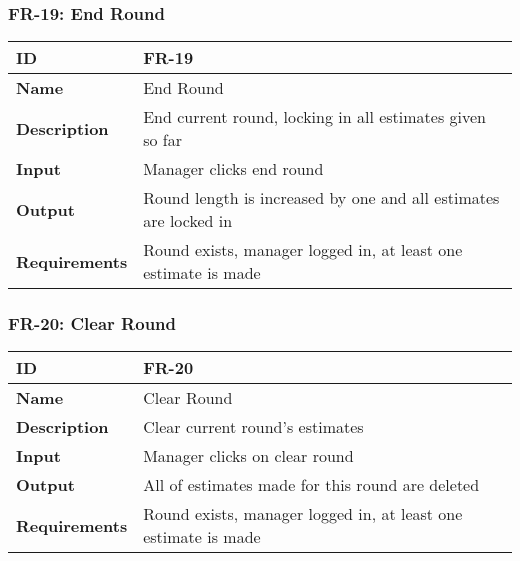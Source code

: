     

    \subsubsection{FR-19: End Round}
    \begin{center}
        \begin{tabularx}{\textwidth}{|l|X|}
            \hline
            \textbf{ID} & FR-19 \\
            \hline
            \textbf{Name} & End Round \\
            \hline
            \textbf{Description} & End current round, locking in all estimates given so far \\
            \hline
            \textbf{Input} & Manager clicks end round \\
            \hline
            \textbf{Output} & Round length is increased by one and all estimates are locked in \\
            \hline
            \textbf{Requirements} & Round exists, manager logged in, at least one estimate is made \\
            \hline
        \end{tabularx}
    \end{center}
    
    

    \subsubsection{FR-20: Clear Round}
    \begin{center}
        \begin{tabularx}{\textwidth}{|l|X|}
            \hline
            \textbf{ID} & FR-20 \\
            \hline
            \textbf{Name} & Clear Round \\
            \hline
            \textbf{Description} & Clear current round's estimates \\
            \hline
            \textbf{Input} & Manager clicks on clear round \\
            \hline
            \textbf{Output} & All of estimates made for this round are deleted \\
            \hline
            \textbf{Requirements} & Round exists, manager logged in, at least one estimate is made \\
            \hline
        \end{tabularx}
    \end{center}
    \newpage
    

